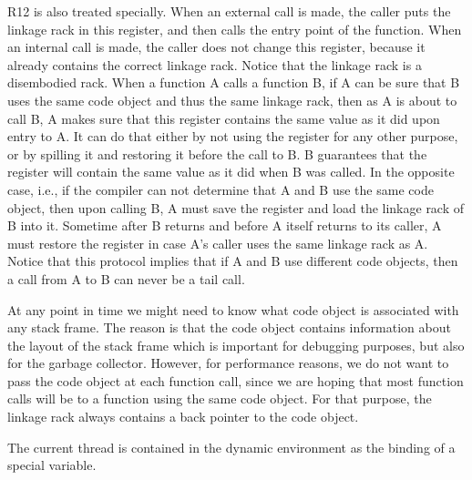 R12 is also treated specially.  When an external call is made, the
caller puts the linkage rack in this register, and then calls the
entry point of the function.  When an internal call is made, the
caller does not change this register, because it already contains the
correct linkage rack.  Notice that the linkage rack is a
disembodied rack.  When a function A calls a function B, if
A can be sure that B uses the same code object and thus the same
linkage rack, then as A is about to call B, A makes sure that this
register contains the same value as it did upon entry to A.  It can do
that either by not using the register for any other purpose, or by
spilling it and restoring it before the call to B.  B guarantees that
the register will contain the same value as it did when B was called.
In the opposite case, i.e., if the compiler can not determine that A
and B use the same code object, then upon calling B, A must save the
register and load the linkage rack of B into it.  Sometime after B
returns and before A itself returns to its caller, A must restore the
register in case A's caller uses the same linkage rack as A.  Notice
that this protocol implies that if A and B use different code objects,
then a call from A to B can never be a tail call.%

At any point in time we might need to know what code object is
associated with any stack frame.  The reason is that the code object
contains information about the layout of the stack frame which is
important for debugging purposes, but also for the garbage collector.
However, for performance reasons, we do not want to pass the code
object at each function call, since we are hoping that most function
calls will be to a function using the same code object.  For that
purpose, the linkage rack always contains a back pointer to the code
object. 

The current thread is contained in the dynamic environment as the
binding of a special variable.
